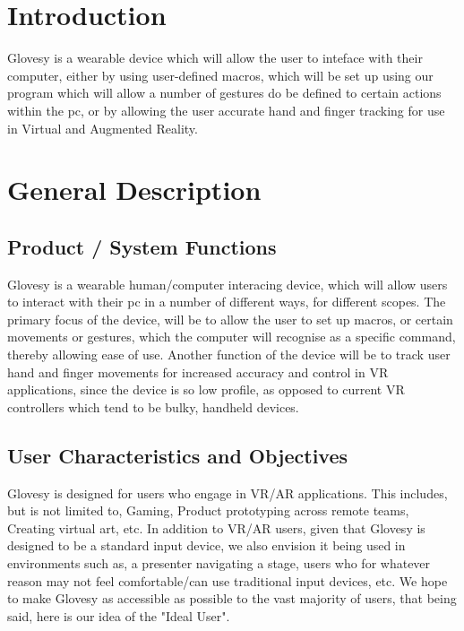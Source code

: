 \documentclass[12pt,a4paper,oneside]{book}
\theoremstyle{plain}
\numberwithin{equation}{chapter}
\renewcommand{\contentsname}{\hfill\bfseries\Large TABLE OF CONTENTS \hfill}
\begin{document}

\newpage
\tableofcontents


\newpage
{}
\chapter*{Introduction}

\noindent Glovesy is a wearable device which will allow the user to inteface with their computer, either by using user-defined macros, which will be set up using our program which will allow a number of gestures do be defined to certain actions within the pc, or by allowing the user accurate hand and finger tracking for use in Virtual and Augmented Reality.
\vspace{2cm}

\chapter*{General Description}

\section{Product / System Functions}

\noindent Glovesy is a wearable human/computer interacing device, which will allow users to interact with their pc in a number of different ways, for different scopes.  The primary focus of the device, will be to allow the user to set up macros, or certain movements or gestures, which the computer will recognise as a specific command, thereby allowing ease of use. Another function of the device will be to track user hand and finger movements for increased accuracy and control in VR applications, since the device is so low profile, as opposed to current VR controllers which tend to be bulky, handheld devices.

\section{User Characteristics and Objectives}

\noindent Glovesy is designed for users who engage in VR/AR applications. This includes, but is not limited to, Gaming, Product prototyping across remote teams,  Creating virtual art, etc. In addition to VR/AR users, given that Glovesy is designed to be a standard input device, we also envision it being used in environments such as,  a presenter navigating a stage, users who for whatever reason may not feel comfortable/can use traditional input devices, etc. We hope to make Glovesy as accessible as possible to the vast majority of users, that being said, here is our idea of the "Ideal User".
\end{document}
